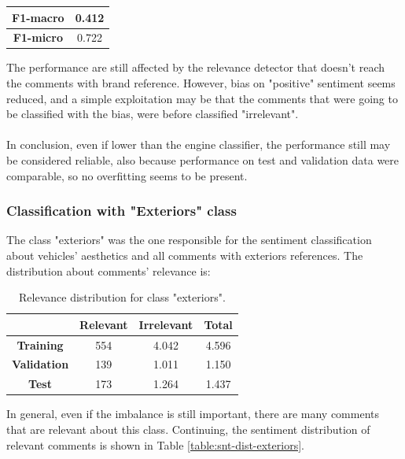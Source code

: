 \begin{center}
	\begin{tabular}{ | c | c | } 
		\hline
		\textbf{F1-macro} & 0.412 \\
		\hline
		\textbf{F1-micro} & 0.722 \\ 
		\hline
	\end{tabular}
\end{center}

The performance are still affected by the relevance detector that doesn't reach the comments with brand reference. However, bias on "positive" sentiment seems reduced, and a simple exploitation may be that the comments that were going to be classified with the bias, were before classified "irrelevant".\\\\
In conclusion, even if lower than the engine classifier, the performance still may be considered reliable, also because performance on test and validation data were comparable, so no overfitting seems to be present.



\subsubsection{Classification with "Exteriors" class}

The class "exteriors" was the one responsible for the sentiment classification about vehicles' aesthetics and all comments with exteriors references. The distribution about comments' relevance is:

\begin{table}[H]
	\centering
	\begin{tabular}{ | c  c  c | c | } 
		\hline
		& \textbf{Relevant} & \textbf{Irrelevant} & \textbf{Total} \\
		\hline
		\textbf{Training} & 554 & 4.042 & 4.596 \\ 
		\hline
		\textbf{Validation} & 139 & 1.011 & 1.150 \\ 
		\hline
		\textbf{Test} & 173 & 1.264 & 1.437 \\
		\hline
	\end{tabular}
	\caption{Relevance distribution for class "exteriors".}
	\label{table:rel-dist-exteriors}
\end{table}

In general, even if the imbalance is still important, there are many comments that are relevant about this class. Continuing, the sentiment distribution of relevant comments is shown in Table \ref{table:snt-dist-exteriors}.

